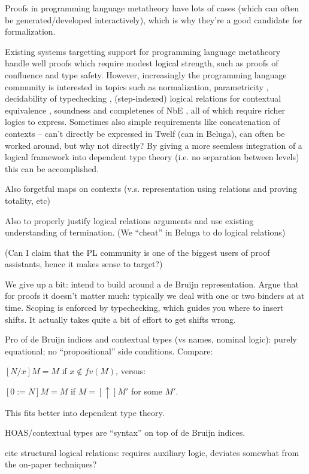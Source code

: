 \documentclass{article}
\begin{document}
Proofs in programming language metatheory have lots of cases (which
can often be generated/developed interactively), which is why they're
a good candidate for formalization.

Existing systems targetting support for programming language
  metatheory handle well proofs which require modest logical
  strength, such as proofs of confluence and type safety. However,
  increasingly the programming language community is interested in
  topics such as normalization, parametricity \citep{Reynolds,morerecent?}, decidability of
  typechecking \citep{Coquand?}, (step-indexed) logical relations for contextual
  equivalence \citep{Dreyer11,others}, soundness and completenes of
  NbE \citep{Dybjer00,Abel07}, all of which require
  richer logics to express. Sometimes also simple requirements like
  concatenation of contexts -- can't directly be expressed in Twelf
  (can in Beluga), can often be worked around, but why not directly? 
  By giving a more seemless integration of a logical framework
  into dependent type theory (i.e. no separation between levels) this
  can be accomplished.

Also forgetful maps on contexts (v.s. representation using relations
and proving totality, etc)

Also to properly justify logical relations arguments and use existing
understanding of termination. (We ``cheat'' in Beluga to do logical relations)

(Can I claim that the PL community is one of the biggest users of
proof assistants, hence it makes sense to target?)

We give up a bit: intend to build around a de Bruijn
representation. Argue that for proofs it doesn't matter much:
typically we deal with one or two binders at at time. Scoping is
enforced by typechecking, which guides you where to insert
shifts. It actually takes quite a bit of effort to get shifts wrong. 

Pro of de Bruijn indices and contextual types (vs names, nominal
logic): purely equational; no ``propositional'' side
conditions. Compare:

$[N/x]M = M$ if $x \not\in fv(M)$, versus:

$[0 := N]M = M$ if $M = [\uparrow]M'$ for some $M'$.

This fits better into dependent type theory.

HOAS/contextual types are ``syntax'' on top of de Bruijn indices.

cite structural logical relations: requires auxiliary logic, deviates
somewhat from the on-paper techniques? \citep{Schurmann08}
\end{document}
